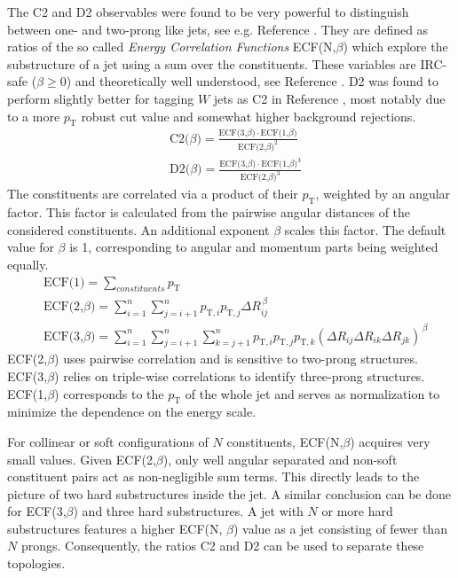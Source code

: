 The C2 and D2 observables were found to be very powerful to distinguish between one- and two-prong like jets, see e.g. Reference \cite{bib:power_counting}. They are defined as ratios of the so called \textit{Energy Correlation Functions} ECF(N,$\beta$) which explore the substructure of a jet using a sum over the constituents. These variables are IRC-safe ($\beta\ge0$) and theoretically well understood, see Reference \cite{bib:analytic_ECF}. D2 was found to perform slightly better for tagging $W$ jets as C2 in Reference \cite{bib:w_tagging}, most notably due to a more $p_{\mathrm{T}}$ robust cut value and somewhat higher background rejections. 
\begin{equation}
\begin{aligned}
 & \text{C2($\beta$)} ={} \frac{\text{ECF(3,$\beta$)}\cdot\text{ECF(1,$\beta$)}}{\text{ECF(2,$\beta$)}^2} \\ 
 & \text{D2($\beta$)} ={} \frac{\text{ECF(3,$\beta$)}\cdot\text{ECF(1,$\beta$)}^3}{\text{ECF(2,$\beta$)}^3}
\end{aligned}
\end{equation}\label{eq:C2D2} 
The constituents are correlated via a product of their $p_{\mathrm{T}}$, weighted by an angular factor. This factor is calculated from the pairwise angular distances of the considered constituents. An additional exponent $\beta$ scales this factor. The default value for $\beta$ is 1, corresponding to angular and momentum parts being weighted equally.
\begin{equation}
\begin{aligned}
 & \text{ECF(1)}  ={} \sum\limits_{constituents} p_{\mathrm{T}} \\ 
 & \text{ECF(2,$\beta$)} ={} \sum\limits_{i=1}^n \sum\limits_{j=i+1}^n p_{\mathrm{T},i}p_{\mathrm{T},j}\Delta R_{ij}^{\,\beta} \\ 
 & \text{ECF(3,$\beta$)} ={} \sum\limits_{i=1}^n \sum\limits_{j=i+1}^n \sum\limits_{k=j+1}^n p_{\mathrm{T},i}p_{\mathrm{T},j}p_{\mathrm{T},k}(\Delta R_{ij} \Delta R_{ik} \Delta R_{jk})^{\,\beta}
\end{aligned}
\end{equation}\label{eq:ECF}
ECF(2,$\beta$) uses pairwise correlation and is sensitive to two-prong structures. ECF(3,$\beta$) relies on triple-wise correlations to identify three-prong structures. ECF(1,$\beta$) corresponds to the $p_{\mathrm{T}}$ of the whole jet and serves as normalization to minimize the dependence on the energy scale.

For collinear or soft configurations of $N$ constituents, ECF(N,$\beta$) acquires very small values. Given ECF(2,$\beta$), only well angular separated and non-soft constituent pairs act as non-negligible sum terms. This directly leads to the picture of two hard substructures inside the jet. A similar conclusion can be done for ECF(3,$\beta$) and three hard substructures. 
A jet with $N$ or more hard substructures features a higher ECF(N, $\beta$) value as a jet consisting of fewer than $N$ prongs. Consequently, the ratios C2 and D2 can be used to separate these topologies.

